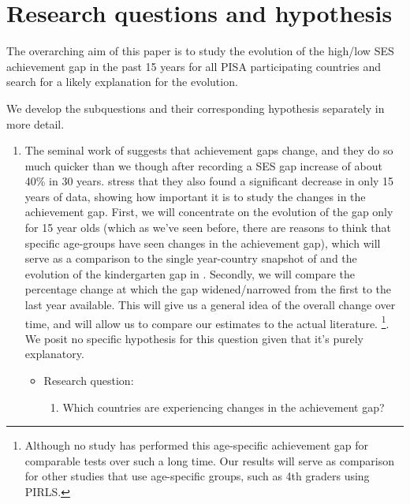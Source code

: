 \documentclass[11pt, a4paper]{article}\usepackage[]{graphicx}\usepackage[]{color}
\begin{document}
\section{Research questions and hypothesis}

The overarching aim of this paper is to study the evolution of the high/low SES achievement gap in the past 15 years for all PISA participating countries and search for a likely explanation for the evolution.

\noindent
We develop the subquestions and their corresponding hypothesis separately in more detail.

\begin{enumerate}

\item The seminal work of \citet{reardon2011} suggests that achievement gaps change, and they do so much quicker than we though after recording a SES gap increase of about 40\% in 30 years. \citet{reardon_portilla} stress that they also found a significant decrease in only 15 years of data, showing how important it is to study the changes in the achievement gap. First, we will concentrate on the evolution of the gap only for 15 year olds (which as we've seen before, there are reasons to think that specific age-groups have seen changes in the achievement gap), which will serve as a comparison to the single year-country snapshot of \citet{anna2016} and the evolution of the kindergarten gap in \citet{reardon_portilla}. Secondly, we will compare the percentage change at which the gap widened/narrowed from the first to the last year available. This will give us a general idea of the overall change over time, and will allow us to compare our estimates to the actual literature. \footnote{Although no study has performed this age-specific achievement gap for comparable tests over such a long time. Our results will serve as comparison for other studies that use age-specific groups, such as 4th graders using PIRLS.}. We posit no specific hypothesis for this question given that it's purely explanatory.

\begin{itemize}
\item Research question:
\begin{enumerate}

\item Which countries are experiencing changes in the achievement gap?

\end{enumerate}
\end{itemize}


\end{enumerate}
\end{document}
